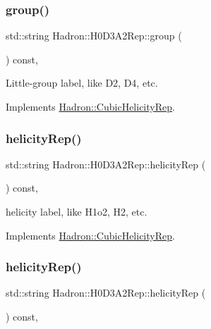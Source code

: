 \subsubsection{\texorpdfstring{group()}{group()}\hspace{0.1cm}{\footnotesize\ttfamily [5/5]}}
{\footnotesize\ttfamily std\+::string Hadron\+::\+H0\+D3\+A2\+Rep\+::group (\begin{DoxyParamCaption}{ }\end{DoxyParamCaption}) const\hspace{0.3cm}{\ttfamily [inline]}, {\ttfamily [virtual]}}

Little-\/group label, like D2, D4, etc. 

Implements \mbox{\hyperlink{structHadron_1_1CubicHelicityRep_a101a7d76cd8ccdad0f272db44b766113}{Hadron\+::\+Cubic\+Helicity\+Rep}}.

\mbox{\label{structHadron_1_1H0D3A2Rep_aed7cbc2156d185f430ce0ce0a4c29f54}} 
\subsubsection{\texorpdfstring{helicityRep()}{helicityRep()}\hspace{0.1cm}{\footnotesize\ttfamily [1/3]}}
{\footnotesize\ttfamily std\+::string Hadron\+::\+H0\+D3\+A2\+Rep\+::helicity\+Rep (\begin{DoxyParamCaption}{ }\end{DoxyParamCaption}) const\hspace{0.3cm}{\ttfamily [inline]}, {\ttfamily [virtual]}}

helicity label, like H1o2, H2, etc. 

Implements \mbox{\hyperlink{structHadron_1_1CubicHelicityRep_af1096946b7470edf0a55451cc662f231}{Hadron\+::\+Cubic\+Helicity\+Rep}}.

\mbox{\label{structHadron_1_1H0D3A2Rep_aed7cbc2156d185f430ce0ce0a4c29f54}} 
\subsubsection{\texorpdfstring{helicityRep()}{helicityRep()}\hspace{0.1cm}{\footnotesize\ttfamily [2/3]}}
{\footnotesize\ttfamily std\+::string Hadron\+::\+H0\+D3\+A2\+Rep\+::helicity\+Rep (\begin{DoxyParamCaption}{ }\end{DoxyParamCaption}) const\hspace{0.3cm}{\ttfamily [inline]}, {\ttfamily [virtual]}}

